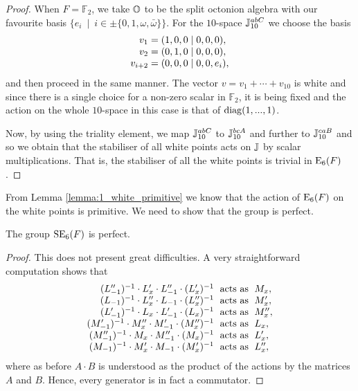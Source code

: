 \begin{proof}
When $F = \mathbb{F}_2$, we take $\mathbb{O}$ to be the split octonion algebra with 
our favourite basis $\{ e_i\ \mid\ i \in \pm \{0,1,\omega,\bar{\omega}\}\}$. For the 
$10$-space $\mathbb{J}_{10}^{abC}$ we choose the basis 
\begin{equation}
	\begin{array}{r@{\;}c@{\;}l}
		v_1 & = & (1,0,0\mid 0,0,0), \\
		v_2 & = & (0,1,0\mid 0,0,0), \\
		v_{i+2} & = & (0,0,0\mid 0,0,e_i),
	\end{array}
\end{equation} 
and then proceed in the same manner. The vector $v = v_1 + \cdots + v_{10}$ is white and since 
there is a single choice for a non-zero scalar in $\mathbb{F}_2$, it is being fixed and 
the action on the whole $10$-space in this case is that of $\mathrm{diag}(1,..., 1)$. 

Now, by using the triality element, we map $\mathbb{J}_{10}^{abC}$ to $\mathbb{J}_{10}^{bcA}$ and further
to $\mathbb{J}_{10}^{caB}$ and so we obtain that the stabiliser of all white points
acts on $\mathbb{J}$ by scalar multiplications. That is, the stabiliser of all the white points
is trivial in $\mathord{\mathrm{E}}_6(F)$. 
\end{proof}

From Lemma \ref{lemma:1_white_primitive} we know that the action of $\mathord{\mathrm{E}}_6(F)$ 
on the white points is primitive. We need to show that the group is perfect.

\begin{lemma}
	The group $\mathrm{SE}_6(F)$ is perfect.
\end{lemma}

\begin{proof}
	This does not present great difficulties. A very straightforward computation 
	shows that 
	\begin{equation*}
	\begin{array}{r@{\;}c@{\;}l}
		(L_{-1}'')^{-1} \cdot L_x' \cdot L_{-1}'' \cdot (L_x')^{-1} & 
								\text{ acts as } & M_x, \\
		(L_{-1})^{-1} \cdot L_x'' \cdot L_{-1} \cdot (L_x'')^{-1} & 
								\text{ acts as } & M_x', \\
		(L_{-1}')^{-1} \cdot L_x \cdot L_{-1}' \cdot (L_x)^{-1} & 
								\text{ acts as } & M_x'', \\
								
		(M_{-1}')^{-1} \cdot M_x'' \cdot M_{-1}' \cdot (M_x'')^{-1} & 
								\text{ acts as } & L_x, \\
		(M_{-1}'')^{-1} \cdot M_x \cdot M_{-1}'' \cdot (M_x)^{-1} & 
								\text{ acts as } & L_x', \\
		(M_{-1})^{-1} \cdot M_x' \cdot M_{-1} \cdot (M_x')^{-1} & 
								\text{ acts as } & L_x'', \\
	\end{array}
	\end{equation*}
	where as before $A \cdot B$ is understood as the product of the actions 
	by the matrices $A$ and $B$. Hence, every generator is in fact a commutator.
\end{proof}

